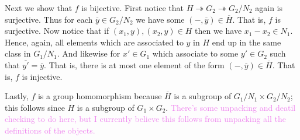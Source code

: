 \documentclass[12pt,letterpaper,boxed]{hmcpset}
\newcommand{\wg}[1]{\textcolor{violet}{#1}}
\begin{document}
\begin{solution}
\begin{itemize}
Next we show that $f$ is bijective. First notice that $H
\twoheadrightarrow G_2 \twoheadrightarrow G_2/N_2$ again is
surjective. Thus for each $\overline y \in G_2/N_2$ we have some $(-,
\overline y) \in \overline H$. That is, $f$ is surjective.
Now notice that if $(x_1, y), (x_2, y) \in H$ then we have $x_1 - x_2
\in N_1$. Hence, again, all elements which are associated to $y$ in
$H$ end up in the same class in $G_1 / N_1$. And likewise for $x' \in
G_1$ which associate to some $y' \in G_2$ such that $\overline{y'} =
\overline y$. 
That is, there is at most
one element of the form $(-, \overline y) \in \overline H$. That is,
$f$ is injective.

Lastly, $f$ is a group homomorphism because $\overline H$ is a
subgroup of $G_1 / N_1 \times G_2 / N_2$; this follows since $H$ is a
subgroup of $G_1 \times G_2$.
\wg{There's some unpacking and deatil checking to do here, but I
currently believe this follows from unpacking all the definitions of
the objects. }

\end{itemize}
\end{solution}

\newpage
\end{document}
